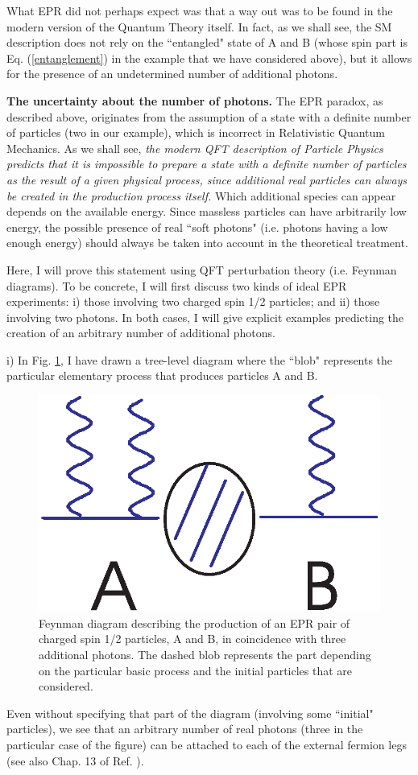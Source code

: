\documentclass[aps,prl,showkeys,showpacs,preprint,groupedaddress]{revtex4}
\begin{document}
What EPR did not perhaps expect was that a way out was to be found
in the modern version of the Quantum Theory itself. In fact, as we
shall see, the SM description does not rely on the ``entangled"
state of A and B (whose spin part is Eq. (\ref{entanglement}) in
the example that we have considered above), but it allows for the
presence of an undetermined number of additional photons.

{\bf The uncertainty about the number of photons.} The EPR
paradox, as described above, originates from the assumption of a
state with a definite number of particles (two in our example),
which is incorrect in Relativistic Quantum Mechanics. As we shall
see, {\it the modern QFT description of Particle Physics predicts
that it is impossible to prepare a state with a definite number of
particles as the result of a given physical process, since
additional real particles can always be created in the production
process itself.} Which additional species can appear depends on
the available energy. Since massless particles can have
arbitrarily low energy, the possible presence of real ``soft
photons" (i.e. photons having a low enough energy) should always
be taken into account in the theoretical treatment.

Here, I will prove this statement using QFT perturbation theory
(i.e. Feynman diagrams). To be concrete, I will first discuss two
kinds of ideal EPR experiments: i) those involving two charged
spin 1/2 particles; and ii) those involving two photons. In both
cases, I will give explicit examples predicting the creation of an
arbitrary number of additional photons.

i) In Fig. \ref{fig1}, I have drawn a tree-level diagram where
the ``blob" represents the particular elementary process that
produces particles A and B.
\begin{figure}
\includegraphics{fig1.eps}
\caption{\label{fig1} Feynman diagram describing the production of
an EPR pair of charged spin 1/2 particles, A and B, in coincidence
with three additional photons. The dashed blob represents the part
depending on the particular basic process and the initial
particles that are considered.}
\end{figure}
Even without specifying that part of the diagram (involving some
``initial" particles), we see that an arbitrary number of real
photons (three in the particular case of the figure) can be
attached to each of the external fermion legs (see also Chap. 13
of Ref. \cite{WeinbookI}).
\end{document}
